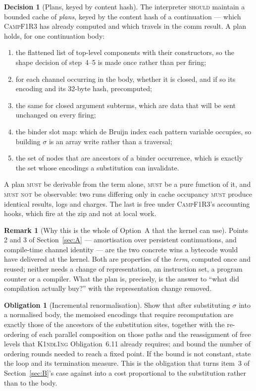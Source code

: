 \documentclass[11pt,a4paper]{article}
\newcommand{\Kind}{\textsc{K1ndl1ng}}
\newcommand{\Camp}{\textsc{CampF1R3}}
\newcommand{\MUST}{\textsc{must}}
\newcommand{\MUSTNOT}{\textsc{must not}}
\newcommand{\SHOULD}{\textsc{should}}
\theoremstyle{definition}
\newtheorem{decision}[definition]{Decision}
\newtheorem{obligation}[definition]{Obligation}
\newtheorem{remark}[definition]{Remark}
\theoremstyle{plain}
\begin{document}
\begin{decision}[Plans, keyed by content hash]\label{dec:plan}
The interpreter \SHOULD{} maintain a bounded cache of \emph{plans}, keyed by the
content hash of a continuation --- which \Camp{} has already computed and which
travels in the comm result. A plan holds, for one continuation body:
\begin{enumerate}[nosep,leftmargin=1.6em]
\item the flattened list of top-level components with their constructors, so the
shape decision of step~4--5 is made once rather than per firing;
\item for each channel occurring in the body, whether it is closed, and if so
its encoding and its 32-byte hash, precomputed;
\item the same for closed argument subterms, which are data that will be sent
unchanged on every firing;
\item the binder slot map: which de Bruijn index each pattern variable occupies,
so building $\sigma$ is an array write rather than a traversal;
\item the set of nodes that are ancestors of a binder occurrence, which is
exactly the set whose encodings a substitution can invalidate.
\end{enumerate}
A plan \MUST{} be derivable from the term alone, \MUST{} be a pure function of
it, and \MUSTNOT{} be observable: two runs differing only in cache occupancy
\MUST{} produce identical results, logs and charges. The last is free under
\Camp's accounting hooks, which fire at the zip and not at local work.
\end{decision}

\begin{remark}[Why this is the whole of Option~A that the kernel can use]
Points 2 and 3 of Section~\ref{sec:A} --- amortisation over persistent
continuations, and compile-time channel identity --- are the two concrete wins a
bytecode would have delivered at the kernel. Both are properties of the
\emph{term}, computed once and reused; neither needs a change of
representation, an instruction set, a program counter or a compiler. What the
plan is, precisely, is the answer to ``what did compilation actually buy?''
with the representation change removed.
\end{remark}

\begin{obligation}[Incremental renormalisation]\label{obl:incr}
Show that after substituting $\sigma$ into a normalised body, the memoised
encodings that require recomputation are exactly those of the ancestors of the
substitution sites, together with the re-ordering of each parallel composition
on those paths and the reassignment of free levels that
\Kind{} Obligation~6.11 already requires; and bound the number of ordering
rounds needed to reach a fixed point. If the bound is not constant, state the
loop and its termination measure. This is the obligation that turns item~3 of
Section~\ref{sec:B}'s case against into a cost proportional to the substitution
rather than to the body.
\end{obligation}
\end{document}
